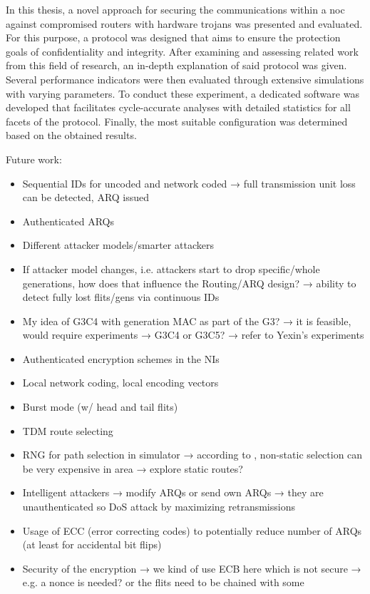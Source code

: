In this thesis, a novel approach for securing the communications within a \gls{noc} against compromised routers with hardware trojans was presented
and evaluated. For this purpose, a protocol was designed that aims to ensure the protection goals of confidentiality and integrity. After examining
and assessing related work from this field of research, an in-depth explanation of said protocol was given. Several performance indicators were then
evaluated through extensive simulations with varying parameters. To conduct these experiment, a dedicated software was developed that facilitates
cycle-accurate analyses with detailed statistics for all facets of the protocol. Finally, the most suitable configuration was determined based on the
obtained results.

Future work:
\begin{itemize}
    \item Sequential IDs for uncoded and network coded → full transmission unit loss can be detected, ARQ issued
    \item Authenticated ARQs
    \item Different attacker models/smarter attackers
    \item If attacker model changes, i.e. attackers start to drop specific/whole generations,
        how does that influence the Routing/ARQ design? → ability to detect fully lost flits/gens via continuous IDs
    \item My idea of G3C4 with generation MAC as part of the G3? → it is feasible, would require experiments → G3C4 or G3C5? → refer to Yexin's
        experiments
    \item Authenticated encryption schemes in the NIs
    \item Local network coding, local encoding vectors
    \item Burst mode (w/ head and tail flits)
    \item TDM route selecting
    \item RNG for path selection in simulator → according to \cite{stefan11enhancingnocs}, non-static selection can be very expensive in area →
        explore static routes?
    \item Intelligent attackers → modify ARQs or send own ARQs → they are unauthenticated so DoS attack by maximizing retransmissions
    \item Usage of ECC (error correcting codes) to potentially reduce number of ARQs (at least for accidental bit flips)
    \item Security of the encryption → we kind of use ECB here which is not secure → e.g. a nonce is needed? or the flits need to be chained with some

\end{itemize}
